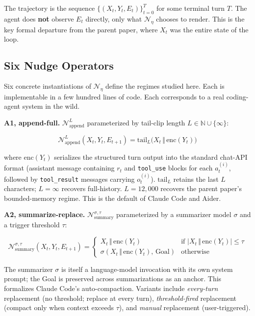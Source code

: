\documentclass{article}
\theoremstyle{plain}
\theoremstyle{definition}
\begin{document}
The trajectory is the sequence $\{(X_t, Y_t, E_t)\}_{t=0}^{T}$ for some terminal turn $T$. The agent does \textbf{not} observe $E_t$ directly, only what $\mathcal{N}_\eta$ chooses to render. This is the key formal departure from the parent paper, where $X_t$ was the entire state of the loop.

\subsection{Six Nudge Operators}

Six concrete instantiations of $\mathcal{N}_\eta$ define the regimes studied here. Each is implementable in a few hundred lines of code. Each corresponds to a real coding-agent system in the wild.

\textbf{A1, append-full.} $\mathcal{N}_\text{append}^L$ parameterized by tail-clip length $L \in \mathbb{N} \cup \{\infty\}$:

\begin{equation*}
\mathcal{N}_\text{append}^L(X_t, Y_t, E_{t+1}) = \mathrm{tail}_L\bigl(X_t \,\Vert\, \mathrm{enc}(Y_t)\bigr)
\end{equation*}

where $\mathrm{enc}(Y_t)$ serializes the structured turn output into the standard chat-API format (assistant message containing $r_t$ and \texttt{tool\_use} blocks for each $a_t^{(i)}$, followed by \texttt{tool\_result} messages carrying $o_t^{(i)}$). $\mathrm{tail}_L$ retains the last $L$ characters; $L = \infty$ recovers full-history. $L = 12{,}000$ recovers the parent paper's bounded-memory regime. This is the default of Claude Code and Aider.

\textbf{A2, summarize-replace.} $\mathcal{N}_\text{summary}^{\sigma, \tau}$ parameterized by a summarizer model $\sigma$ and a trigger threshold $\tau$:

\begin{equation*}
\mathcal{N}_\text{summary}^{\sigma, \tau}(X_t, Y_t, E_{t+1}) = \begin{cases}
X_t \,\Vert\, \mathrm{enc}(Y_t) & \text{if } |X_t \,\Vert\, \mathrm{enc}(Y_t)| \le \tau \\
\sigma(X_t \,\Vert\, \mathrm{enc}(Y_t),\, \text{Goal}) & \text{otherwise}
\end{cases}
\end{equation*}

The summarizer $\sigma$ is itself a language-model invocation with its own system prompt; the Goal is preserved across summarizations as an anchor. This formalizes Claude Code's auto-compaction. Variants include \textit{every-turn} replacement (no threshold; replace at every turn), \textit{threshold-fired} replacement (compact only when context exceeds $\tau$), and \textit{manual} replacement (user-triggered).
\end{document}
